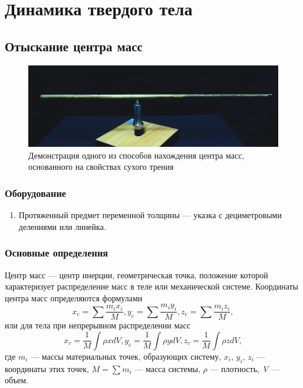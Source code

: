 \documentclass[All.tex]{subfiles}
\begin{document}

\chapter{\textcolor{PineGreen}{Динамика твердого тела}}
		\section{Отыскание центра масс}

	
	\begin{figure}[H] 	
		\centering 	
		\includegraphics[width=0.9\linewidth]{center-1.png}
		\caption{Демонстрация одного из способов нахождения центра масс, основанного на свойствах сухого трения}
		\label{center-1}
	\end{figure}
	
	\subsection*{\textcolor{PineGreen}{Оборудование}}
	
	\begin{enumerate} 
		\item Протяженный предмет переменной толщины — указка с дециметровыми делениями или линейка.
	\end{enumerate}

\subsection*{\textcolor{PineGreen}{Основные определения}}
	
Центр масс — центр инерции, геометрическая точка, положение которой характеризует распределение масс в теле или механической системе. 
Координаты центра масс определяются формулами
$$
	x_c =\sum \dfrac{m_i x_i}{M}, y_c =\sum \dfrac{m_i y_i}{M}, z_c =\sum \dfrac{m_i z_i}{M},
$$
	или для тела при непрерывном распределении масс
$$
	x_c = \dfrac1M \int \rho x dV, y_c =\dfrac1M \int \rho y dV, z_c =\dfrac1M \int \rho z dV,
$$
	где $ m_i $ — массы материальных точек, образующих систему, $ x_i $, $ y_i $, $ z_i $ — координаты этих точек, $ M = \sum m_i $ — масса системы, $ \rho $ — плотность, \textit{V} — объем. 
	
\end{document}
